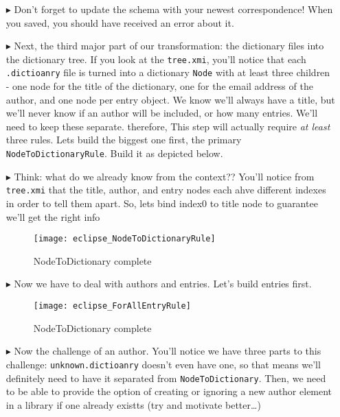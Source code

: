 \begin{itemize}
\item[$\blacktriangleright$] Don't forget to update the schema with your newest correspondence! When you saved, you should have received an error about it.

\item[$\blacktriangleright$] Next, the third major part of our transformation: the dictionary files into the dictionary tree. If you look at the
\texttt{tree.xmi}, you'll notice that each \texttt{.dictioanry} file is turned into a dictionary \texttt{Node} with at least three children - one node for the
title of the dictionary, one for the email address of the author, and one node per entry object. We know we'll always have a title, but we'll never know if an
author will be included, or how many entries. We'll need to keep these separate. therefore, This step will actually require \emph{at least} three rules. Lets
build the biggest one first, the primary \texttt{NodeToDictionaryRule}. Build it as depicted below.

\item[$\blacktriangleright$] Think: what do we already know from the context?? You'll notice from \texttt{tree.xmi} that the title, author, and entry nodes each
ahve different indexes in order to tell them apart. So, lets bind index0 to title node to guarantee we'll get the right info

\begin{figure}[htbp]
\begin{center}
  \texttt{[image: eclipse\_NodeToDictionaryRule]}
  \caption{NodeToDictionary complete}
  \label{eclipse:NodeToDictionaryRule}
\end{center}
\end{figure}

\item[$\blacktriangleright$] Now we have to deal with authors and entries. Let's build entries first.

\begin{figure}[htbp]
\begin{center}
  \texttt{[image: eclipse\_ForAllEntryRule]}
  \caption{NodeToDictionary complete}
  \label{eclipse:NodeToDictionaryRule}
\end{center}
\end{figure}

\item[$\blacktriangleright$] Now the challenge of an author. You'll notice we have three parts to this challenge: \texttt{unknown.dictioanry} doesn't even have
one, so that means we'll definitely need to have it separated from \texttt{NodeToDictionary}. Then, we need to be able to provide the option of creating or
ignoring a new author element in a library if one already existts (try and motivate better\ldots)


\end{itemize}
